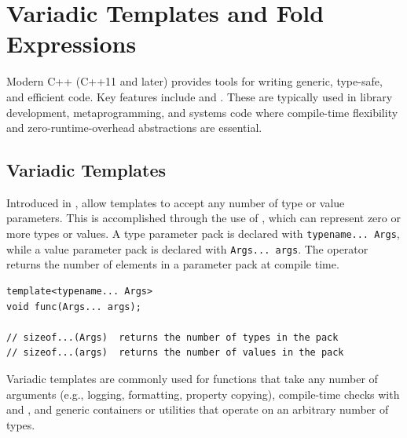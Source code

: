 \section{Variadic Templates and Fold Expressions}
Modern C++ (C++11 and later) provides tools for writing generic, type-safe, and efficient code. Key features include  and . These are typically used in library development, metaprogramming, and systems code where compile-time flexibility and zero-runtime-overhead abstractions are essential.

\subsection{Variadic Templates}
Introduced in ,  allow templates to accept any number of type or value parameters. This is accomplished through the use of , which can represent zero or more types or values. A type parameter pack is declared with \texttt{typename... Args}, while a value parameter pack is declared with \texttt{Args... args}. The  operator returns the number of elements in a parameter pack at compile time.
\begin{lstlisting}
template<typename... Args>
void func(Args... args);

// sizeof...(Args)  returns the number of types in the pack
// sizeof...(args)  returns the number of values in the pack
\end{lstlisting}
Variadic templates are commonly used for functions that take any number of arguments (e.g., logging, formatting, property copying), compile-time checks with  and , and generic containers or utilities that operate on an arbitrary number of types.

